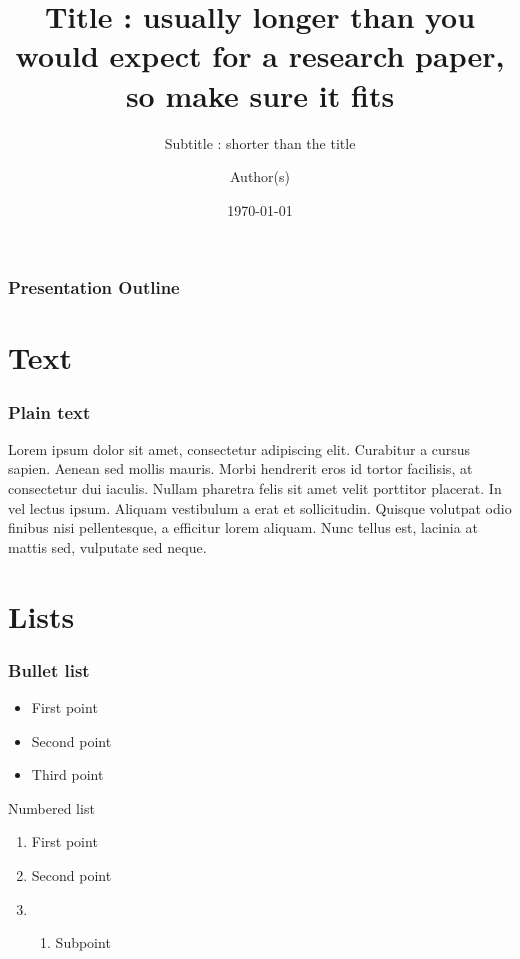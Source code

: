 \documentclass[
	11pt, %
	aspectratio=169, %
]{beamer}
\title{Title : usually longer than you would expect for a research paper, so make sure it fits}
\subtitle{Subtitle : shorter than the title}
\author{Author(s)}
\institute{ARAMIS Lab}
\date{\today}
\begin{document}

\begin{frame}
	\titlepage %
\end{frame}


\begin{frame}
	\frametitle{Presentation Outline} %
	\tableofcontents %
\end{frame}


\section{Text}

\begin{frame}
  \frametitle{Plain text}

  Lorem ipsum dolor sit amet, consectetur adipiscing elit. Curabitur a cursus sapien. Aenean sed mollis mauris. Morbi hendrerit eros id tortor facilisis, at consectetur dui iaculis. Nullam pharetra felis sit amet velit porttitor placerat. In vel lectus ipsum. Aliquam vestibulum a erat et sollicitudin. Quisque volutpat odio finibus nisi pellentesque, a efficitur lorem aliquam. Nunc tellus est, lacinia at mattis sed, vulputate sed neque.  

\end{frame}

\section{Lists}

\begin{frame}
  \frametitle{Bullet list}

  \begin{itemize}
    \item First point
    \item Second point
    \item Third point
  \end{itemize} 

\end{frame}

\begin{frame}{Numbered list}
  \begin{enumerate}
    \item First point
    \item Second point
    \item \begin{enumerate}
      \item Subpoint
    \end{enumerate} 
  \end{enumerate}

\end{frame}
\end{document}
